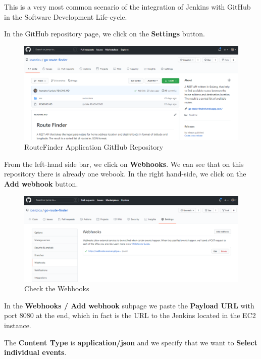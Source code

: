 \documentclass[12pt,a4paper,twoside]{article}
\begin{document}
This is a very most common scenario of the integration of Jenkins with GitHub in the Software Development Life-cycle.


In the GitHub repository page, we click on the \textbf{Settings} button.


\begin{figure}[H]
    \centering
        \includegraphics[width=15cm]{images-aws/40-github-project.png}
        \caption{RouteFinder Application GitHub Repository}
\end{figure}


From the left-hand side bar, we click on \textbf{Webhooks}. We can see that on this repository there is already one webook. In the right hand-side, we click on the \textbf{Add webhook} button.


\begin{figure}[H]
    \centering
        \includegraphics[width=15cm]{images-aws/41-web-hook.png}
        \caption{Check the Webhooks}
\end{figure}


In the \textbf{Webhooks / Add webhook} subpage we paste the \textbf{Payload URL}  with port 8080 at the end, which in fact is the URL to the Jenkins located in the EC2 instance.


The \textbf{Content Type} is \textbf{application/json} and we specify that we want to \textbf{Select individual events}.
\end{document}
